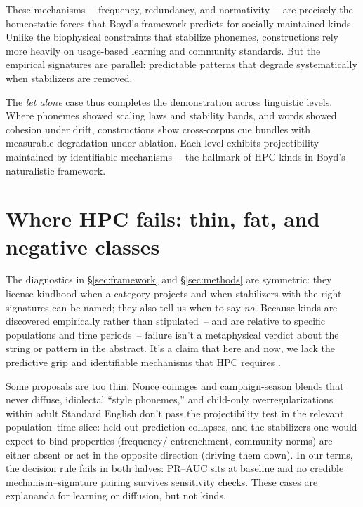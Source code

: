 \documentclass[12pt]{article}
\begin{document}
These mechanisms~-- frequency, redundancy, and normativity~-- are precisely the homeostatic forces that Boyd's framework predicts for socially maintained kinds. Unlike the biophysical constraints that stabilize phonemes, constructions rely more heavily on usage-based learning and community standards. But the empirical signatures are parallel: predictable patterns that degrade systematically when stabilizers are removed.

The \textit{let alone} case thus completes the demonstration across linguistic levels. Where phonemes showed scaling laws and stability bands, and words showed cohesion under drift, constructions show cross-corpus cue bundles with measurable degradation under ablation. Each level exhibits projectibility maintained by identifiable mechanisms~-- the hallmark of HPC kinds in Boyd's naturalistic framework.


\section{Where HPC fails: thin, fat, and negative classes}\label{sec:failures}

The diagnostics in \S\ref{sec:framework} and \S\ref{sec:methods} are symmetric: they license kindhood when a category projects and when stabilizers with the right signatures can be named; they also tell us when to say \textit{no}. Because kinds are discovered empirically rather than stipulated~-- and are relative to specific populations and time periods~-- failure isn't a metaphysical verdict about the string or pattern in the abstract. It's a claim that here and now, we lack the predictive grip and identifiable mechanisms that HPC requires \citep{Boyd1991Enthusiasm,Boyd1999Homeostasis}.



Some proposals are too thin. Nonce coinages and campaign-season blends that never diffuse, idiolectal \enquote{style phonemes,} and child-only overregularizations within adult Standard English don't pass the projectibility test in the relevant population–time slice: held-out prediction collapses, and the stabilizers one would expect to bind properties (frequency/ entrenchment, community norms) are either absent or act in the opposite direction (driving them down). In our terms, the decision rule fails in both halves: PR–AUC sits at baseline and no credible mechanism–signature pairing survives sensitivity checks. These cases are explananda for learning or diffusion, but not kinds.
\end{document}
